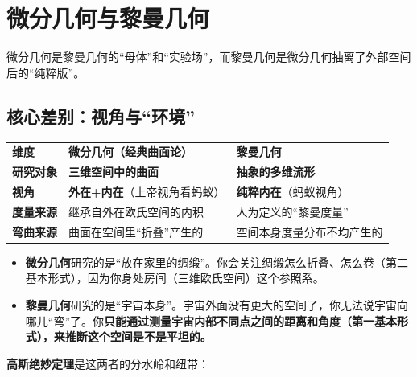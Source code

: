 
\chapter{微分几何与黎曼几何}

微分几何是黎曼几何的“母体”和“实验场”，而黎曼几何是微分几何抽离了外部空间后的“纯粹版”。

\section{核心差别：视角与“环境”}

\begin{table}[h]
\centering
\renewcommand{\arraystretch}{1.5}
\begin{tabular}{p{2.5cm}ll}
\toprule
\textbf{维度} & \textbf{微分几何（经典曲面论）} & \textbf{黎曼几何} \\ 
\textbf{研究对象} & \textbf{三维空间中的曲面} & \textbf{抽象的多维流形}\\
\textbf{视角} & \textbf{外在+内在}（上帝视角看蚂蚁） & \textbf{纯粹内在}（蚂蚁视角） \\
\textbf{度量来源} & 继承自外在欧氏空间的内积 & 人为定义的“黎曼度量” \\
\textbf{弯曲来源} & 曲面在空间里“折叠”产生的 & 空间本身度量分布不均产生的 \\ \bottomrule
\end{tabular}
\end{table}


\begin{itemize}
\item \textbf{微分几何}研究的是“放在家里的绸缎”。你会关注绸缎怎么折叠、怎么卷（第二基本形式），因为你身处房间（三维欧氏空间）这个参照系。
\item \textbf{黎曼几何}研究的是“宇宙本身”。宇宙外面没有更大的空间了，你无法说宇宙向哪儿“弯”了。你{\bf 只能通过测量宇宙内部不同点之间的距离和角度（第一基本形式），来推断这个空间是不是平坦的。}
\end{itemize}


\textbf{高斯绝妙定理}是这两者的分水岭和纽带：

